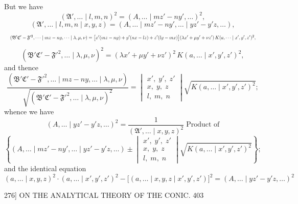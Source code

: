 \documentclass[11pt]{article}
\begin{document}
But we have
\[ (\mathfrak{A}',\dots \mid l,m,n)^{2}=(A,\dots \mid mz'-ny',\dots)^{2}, \]
\[ (\mathfrak{A}',\dots \mid l,m,n \mid x,y,z)=(A,\dots \mid mz'-ny',\dots \mid yz'-y'z,\dots), \]
\[ \resizebox{\textwidth}{!}{$\displaystyle
(\mathfrak{B}'\mathfrak{C}'-\mathfrak{F}'^{2},\dots \mid mz-ny,\dots \mid \lambda,\mu,\nu)
=\bigl[x'(mz-ny)+y'(nx-lz)+z'(ly-mx)\bigr](\lambda x'+\mu y'+\nu z')\,K(a,\dots \mid x',y',z')^{2},
$} \]
\[ (\mathfrak{B}'\mathfrak{C}'-\mathfrak{F}'^{2},\dots \mid \lambda,\mu,\nu)^{2}=(\lambda x'+\mu y'+\nu z')^{2}\,K(a,\dots \mid x',y',z')^{2}, \]
and thence
\[ \frac{(\mathfrak{B}'\mathfrak{C}'-\mathfrak{F}'^{2},\dots \mid mz-ny,\dots \mid \lambda,\mu,\nu)}{\sqrt{(\mathfrak{B}'\mathfrak{C}'-\mathfrak{F}'^{2},\dots \mid \lambda,\mu,\nu)^{2}}}
=\begin{vmatrix}x',\;y',\;z'\\ x,\;y,\;z\\ l,\;m,\;n\end{vmatrix}\sqrt{K(a,\dots \mid x',y',z')^{2}}; \]
whence we have
\[ (A,\dots \mid yz'-y'z,\dots)^{2}=\frac{1}{(\mathfrak{A}',\dots \mid x,y,z)^{2}}\;\text{Product of} \]
\[ \left\{(A,\dots \mid mz'-ny',\dots \mid yz'-y'z,\dots)\pm
\begin{vmatrix}x',\;y',\;z'\\ x,\;y,\;z\\ l,\;m,\;n\end{vmatrix}\sqrt{K(a,\dots \mid x',y',z')^{2}}\right\}; \]
and the identical equation
\[ (a,\dots \mid x,y,z)^{2}\cdot(a,\dots \mid x',y',z')^{2}-\bigl[(a,\dots \mid x,y,z \mid x',y',z')\bigr]^{2}=(A,\dots \mid yz'-y'z,\dots)^{2} \]

\begin{center}
\textsc{276]} \hfill ON THE ANALYTICAL THEORY OF THE CONIC. \hfill 403
\end{center}
\end{document}

